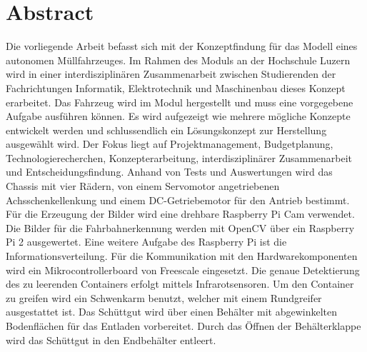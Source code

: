 \section*{Abstract}
Die vorliegende Arbeit befasst sich mit der Konzeptfindung für das Modell eines autonomen Müllfahrzeuges. Im Rahmen des Moduls \grqq an der Hochschule Luzern wird in einer interdisziplinären Zusammenarbeit zwischen Studierenden der Fachrichtungen Informatik, Elektrotechnik und Maschinenbau dieses Konzept erarbeitet. Das Fahrzeug wird im Modul \grqq hergestellt und muss eine vorgegebene Aufgabe ausführen können. Es wird aufgezeigt wie mehrere mögliche Konzepte entwickelt werden und schlussendlich ein Lösungskonzept zur Herstellung ausgewählt wird. Der Fokus liegt auf Projektmanagement, Budgetplanung, Technologierecherchen, Konzepterarbeitung, interdisziplinärer Zusammenarbeit und Entscheidungsfindung. Anhand von Tests und Auswertungen wird das Chassis mit vier Rädern, von einem Servomotor angetriebenen Achsschenkellenkung und einem DC-Getriebemotor für den Antrieb bestimmt. Für die Erzeugung der Bilder wird eine drehbare Raspberry Pi Cam verwendet. Die Bilder für die Fahrbahnerkennung werden mit OpenCV über ein Raspberry Pi 2 ausgewertet. Eine weitere Aufgabe des Raspberry Pi ist die Informationsverteilung. Für die Kommunikation mit den Hardwarekomponenten wird ein Mikrocontrollerboard von Freescale eingesetzt. Die genaue Detektierung des zu leerenden Containers erfolgt mittels Infrarotsensoren. Um den Container zu greifen wird ein Schwenkarm benutzt, welcher mit einem Rundgreifer ausgestattet ist. Das Schüttgut wird über einen Behälter mit abgewinkelten Bodenflächen für das Entladen vorbereitet. Durch das Öffnen der Behälterklappe wird das Schüttgut in den Endbehälter entleert.
\clearpage